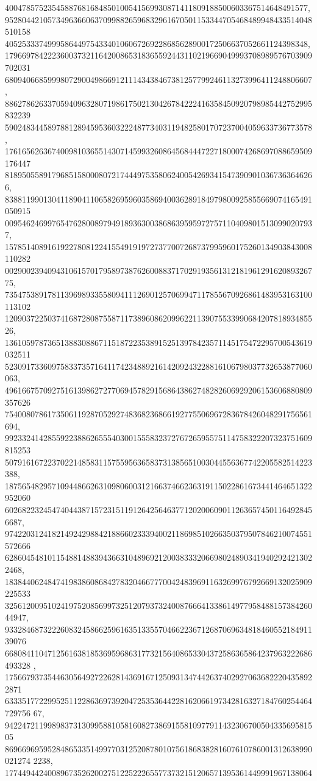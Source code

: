 \documentclass[12pt]{article}
\begin{document}
40047857523545887681684850100541569930871411809188500603367514648491577, 
952804421057349636606370998826596832961670501153344705468489948433514048510158
40525333749995864497543340106067269228685628900172506637052661124398348, 
179669784222360037321164200865318365592443110219669049993708989576703909702031
680940668599980729004986691211143438467381257799246113273996411248806607, 
886278626337059409632807198617502130426784222416358450920798985442752995832239
590248344589788128945953603222487734031194825801707237004059633736773578, 
176165626367400981036551430714599326086456844472271800074268697088659509176447
8189505589179685158000807217444975358062400542693415473909010367363646266, 
838811990130411890411065826959603586940036289184979800925855669074165491050915
0095462469976547628008979491893630038686395959727571104098015130990207937, 
157851408916192278081224155491919727377007268737995960175260134903843008110282
00290023940943106157017958973876260088371702919356131218196129162089326775, 
735475389178113969893355809411126901257069947117855670926861483953163100113102
12090372250374168728087558711738960862099622113907553399068420781893485526, 
136105978736513883088671151872235389152513978423571145175472295700543619032511
523091733609758337357164117423488921614209243228816106798037732653877060063, 
496166757092751613986272770694578291568643862748282606929206153606880809357626
754008078617350611928705292748368236866192775506967283678426048291756561694, 
992332414285592238862655540300155583237276726595575114758322207323751609815253
507916167223702214858311575595636583731385651003044556367742205582514223388, 
187565482957109448662631098060031216637466236319115022861673441464651322952060
6026822324547404438715723151191264256463771202006090112636574501164928456687, 
974220312418214924298842188660233394002118698510266350379507846210074551572666
6286045481011548814883943663104896921200383332066980248903419402924213022468, 
183844062484741983860868427832046677700424839691163269976792669132025909225533
32561200951024197520856997325120793732400876664133861497795848815738426044947,
 93328468732226083245866259616351335570466223671268706963481846055218491139076
668084110471256163818536959686317732156408653304372586365864237963222686493328
, 1756679373544630564927226281436916712509313474426374029270636822204358922871
633351772299525112286369739204725353644228162066197342816327184760254464729756
67, 94224721199898373130995881058160827386915581097791143230670050433569581505
869669695952848653351499770312520878010756186838281607610786001312638990021274
2238, 177449442400896735262002751225222655773732151206571395361449991967138064
\end{document}
